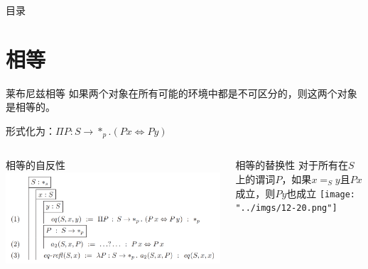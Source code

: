 \documentclass[UTF8,aspectratio=169,mathserif]{beamer}
\begin{document}
	\begin{frame}{目录}
		\tableofcontents
	\end{frame}

	\section{相等}
		\begin{frame}[shrink]
			\begin{block}{莱布尼兹相等}
				如果两个对象在所有可能的环境中都是不可区分的，则这两个对象是相等的。
				
				形式化为：$\Pi P:S\rightarrow*_p.(Px\Leftrightarrow Py)$
			\end{block}
		
			\begin{columns}
				\begin{column}{0.5\textwidth}
					\begin{block}{相等的自反性}
						\includegraphics[width=\linewidth]{"../imgs/12-19.png"}
					\end{block}
				\end{column}
				\begin{column}{0.5\textwidth}
					\begin{block}{相等的替换性}
						对于所有在$S$上的谓词$P$，如果$x=_Sy$且$Px$成立，则$Py$也成立
						\texttt{[image: "../imgs/12-20.png"]}
					\end{block}
				\end{column}
			\end{columns}
		\end{frame}
	
\end{document}
